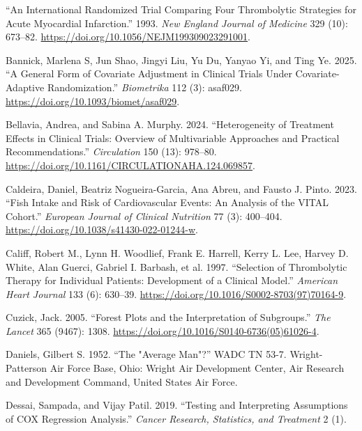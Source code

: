 \documentclass{article}
\newlength{\cslhangindent}
\newenvironment{CSLReferences}[2] %
 {\begin{list}{}{%
  \setlength{\itemindent}{0pt}
  \setlength{\leftmargin}{0pt}
  \setlength{\parsep}{0pt}
  \ifodd #1
   \setlength{\leftmargin}{\cslhangindent}
   \setlength{\itemindent}{-1\cslhangindent}
  \fi
  \setlength{\itemsep}{#2\baselineskip}}}
 {\end{list}}
\begin{document}
\label{refs}
\begin{CSLReferences}{1}{0}
{``An {International Randomized Trial Comparing Four Thrombolytic
Strategies} for {Acute Myocardial Infarction}.''} 1993. \emph{New
England Journal of Medicine} 329 (10): 673--82.
\url{https://doi.org/10.1056/NEJM199309023291001}.

Bannick, Marlena S, Jun Shao, Jingyi Liu, Yu Du, Yanyao Yi, and Ting Ye.
2025. {``A General Form of Covariate Adjustment in Clinical Trials Under
Covariate-Adaptive Randomization.''} \emph{Biometrika} 112 (3): asaf029.
\url{https://doi.org/10.1093/biomet/asaf029}.

Bellavia, Andrea, and Sabina A. Murphy. 2024. {``Heterogeneity of
{Treatment} {Effects} in {Clinical} {Trials}: {Overview} of
{Multivariable} {Approaches} and {Practical} {Recommendations}.''}
\emph{Circulation} 150 (13): 978--80.
\url{https://doi.org/10.1161/CIRCULATIONAHA.124.069857}.

Caldeira, Daniel, Beatriz Nogueira-Garcia, Ana Abreu, and Fausto J.
Pinto. 2023. {``Fish Intake and Risk of Cardiovascular Events: An
Analysis of the {VITAL} Cohort.''} \emph{European Journal of Clinical
Nutrition} 77 (3): 400--404.
\url{https://doi.org/10.1038/s41430-022-01244-w}.

Califf, Robert M., Lynn H. Woodlief, Frank E. Harrell, Kerry L. Lee,
Harvey D. White, Alan Guerci, Gabriel I. Barbash, et al. 1997.
{``Selection of Thrombolytic Therapy for Individual Patients:
{Development} of a Clinical Model.''} \emph{American Heart Journal} 133
(6): 630--39. \url{https://doi.org/10.1016/S0002-8703(97)70164-9}.

Cuzick, Jack. 2005. {``Forest Plots and the Interpretation of
Subgroups.''} \emph{The Lancet} 365 (9467): 1308.
\url{https://doi.org/10.1016/S0140-6736(05)61026-4}.

Daniels, Gilbert S. 1952. {``The "{Average Man}"?''} WADC TN 53-7.
Wright-Patterson Air Force Base, Ohio: {Wright Air Development Center,
Air Research and Development Command, United States Air Force}.

Dessai, Sampada, and Vijay Patil. 2019. {``Testing and Interpreting
Assumptions of {COX} Regression Analysis.''} \emph{Cancer Research,
Statistics, and Treatment} 2 (1).


\end{CSLReferences}
\end{document}
